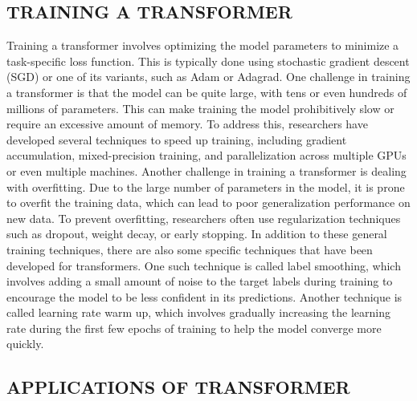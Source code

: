 \documentclass[letterpaper, 10pt, conference]{ieeeconf}
\begin{document}
        
        
        \subsection{TRAINING A TRANSFORMER}
        
        Training a transformer involves optimizing the model parameters to minimize a task-specific loss function. This is typically done
        using stochastic gradient descent (SGD) or one of its variants, such as Adam or Adagrad.
        One challenge in training a transformer is that the model can be quite large, with tens or even hundreds of millions of
        parameters. This can make training the model prohibitively slow or require an excessive amount of memory. To address this,
        researchers have developed several techniques to speed up training, including gradient accumulation, mixed-precision training, and
        parallelization across multiple GPUs or even multiple machines.
        Another challenge in training a transformer is dealing with overfitting. Due to the large number of parameters in the
        model, it is prone to overfit the training data, which can lead to poor generalization performance on new data. To prevent
        overfitting, researchers often use regularization techniques such as dropout, weight decay, or early stopping.
        In addition to these general training techniques, there are also some specific techniques that have been developed for
        transformers. One such technique is called label smoothing, which involves adding a small amount of noise to the target labels
        during training to encourage the model to be less confident in its predictions. Another technique is called learning rate warm up,
        which involves gradually increasing the learning rate during the first few epochs of training to help the model converge more
        quickly.\cite{vaswani2017}
        
        
        \subsection{APPLICATIONS OF TRANSFORMER}
        
\end{document}
